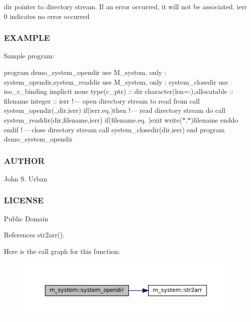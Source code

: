 dir pointer to directory stream. If an error occurred, it will not be associated. ierr 0 indicates no error occurred \subsubsection*{E\+X\+A\+M\+P\+LE}

Sample program\+:

program demo\+\_\+system\+\_\+opendir use M\+\_\+system, only \+: system\+\_\+opendir,system\+\_\+readdir use M\+\_\+system, only \+: system\+\_\+closedir use iso\+\_\+c\+\_\+binding implicit none type(c\+\_\+ptr) \+:\+: dir character(len=\+:),allocatable \+:\+: filename integer \+:\+: ierr !--- open directory stream to read from call system\+\_\+opendir(\textquotesingle{}.\textquotesingle{},dir,ierr) if(ierr.\+eq.)then !--- read directory stream do call system\+\_\+readdir(dir,filename,ierr) if(filename.\+eq.\textquotesingle{} \textquotesingle{})exit write($\ast$,$\ast$)filename enddo endif !--- close directory stream call system\+\_\+closedir(dir,ierr) end program demo\+\_\+system\+\_\+opendir \subsubsection*{A\+U\+T\+H\+OR}

John S. Urban \subsubsection*{L\+I\+C\+E\+N\+SE}

Public Domain 

References str2arr().

Here is the call graph for this function\+:
\nopagebreak
\begin{figure}[H]
\begin{center}
\leavevmode
\includegraphics[width=350pt]{namespacem__system_a622cc67c03e8cdea1d4c2430bb36081b_cgraph}
\end{center}
\end{figure}
\mbox{\label{namespacem__system_ae8f39e1d4e420396319105e4e81f92b5}} 
